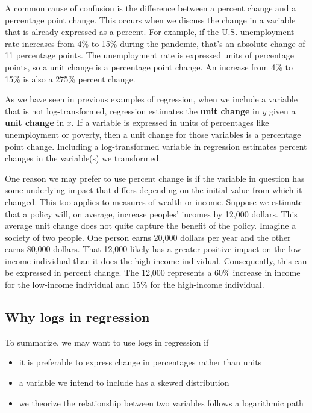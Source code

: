 \documentclass[
]{book}
\providecommand{\tightlist}{%
  \setlength{\itemsep}{0pt}\setlength{\parskip}{0pt}}
\begin{document}
A common cause of confusion is the difference between a percent change and a percentage point change. This occurs when we discuss the change in a variable that is already expressed as a percent. For example, if the U.S. unemployment rate increases from 4\% to 15\% during the pandemic, that's an absolute change of 11 percentage points. The unemployment rate is expressed units of percentage points, so a unit change is a percentage point change. An increase from 4\% to 15\% is also a 275\% percent change.

As we have seen in previous examples of regression, when we include a variable that is not log-transformed, regression estimates the \textbf{unit change} in \(y\) given a \textbf{unit change} in \(x\). If a variable is expressed in units of percentages like unemployment or poverty, then a unit change for those variables is a percentage point change. Including a log-transformed variable in regression estimates percent changes in the variable(s) we transformed.

One reason we may prefer to use percent change is if the variable in question has some underlying impact that differs depending on the initial value from which it changed. This too applies to measures of wealth or income. Suppose we estimate that a policy will, on average, increase peoples' incomes by 12,000 dollars. This average unit change does not quite capture the benefit of the policy. Imagine a society of two people. One person earns 20,000 dollars per year and the other earns 80,000 dollars. That 12,000 likely has a greater positive impact on the low-income individual than it does the high-income individual. Consequently, this can be expressed in percent change. The 12,000 represents a 60\% increase in income for the low-income individual and 15\% for the high-income individual.

\hypertarget{why-logs-in-regression}{%
\subsection{Why logs in regression}\label{why-logs-in-regression}}

To summarize, we may want to use logs in regression if

\begin{itemize}
\tightlist
\item
  it is preferable to express change in percentages rather than units
\item
  a variable we intend to include has a skewed distribution
\item
  we theorize the relationship between two variables follows a logarithmic path
\end{itemize}
\end{document}
